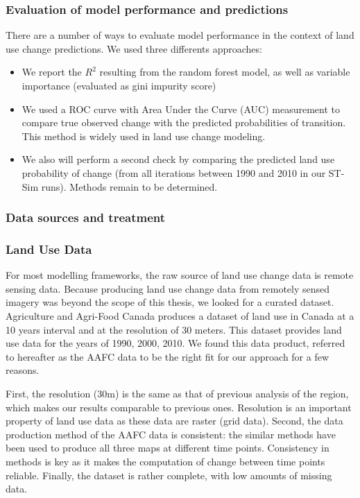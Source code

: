\subsubsection{Evaluation of model performance and predictions}
There are a number of ways to evaluate model performance in the context of land use change predictions. We used three differents approaches:
\begin{itemize}
  \item We report the $R^{2}$ resulting from the random forest model, as well as variable importance (evaluated as gini impurity score)
  \item We used a ROC curve with Area Under the Curve (AUC) measurement to compare true observed change with the predicted probabilities of transition. This method is widely used  in land use change modeling.
  \item We also will perform a second check by comparing the predicted land use probability of change (from all iterations between 1990 and 2010 in our ST-Sim runs). Methods remain to be determined.\\
\end{itemize}

\subsubsection{Data sources and treatment}

\subsubsection*{Land Use Data}
For most modelling frameworks, the raw source of land use change data is remote sensing data. Because producing land use change data from remotely sensed imagery was beyond the scope of this thesis, we looked for a curated dataset. Agriculture and Agri-Food Canada produces a dataset of land use in Canada at a 10 years interval and at the resolution of 30 meters. This dataset provides land use data for the years of 1990, 2000, 2010. We found this data product, referred to hereafter as the AAFC data  to be the right fit for our approach for a few reasons.

First, the resolution (30m) is the same as that of previous analysis of the region, which makes our results comparable to previous ones. Resolution is an important property of land use data as these data are raster (grid data). Second, the data production method of the AAFC  data is consistent: the similar methods have been used to produce all three maps at different time points. Consistency in methods is key as it makes the computation of change between time points reliable. Finally, the dataset is rather complete, with low amounts of missing data.

